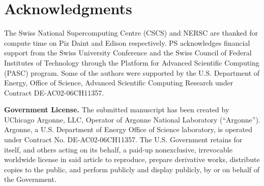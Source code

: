 \documentclass[]{siamart0216}
\begin{document}
\section{Acknowledgments}
The Swiss National Supercomputing Centre (CSCS) and NERSC are thanked for compute time on Piz Daint and Edison respectively.
PS acknowledges financial support from the Swiss University Conference and the Swiss Council of Federal
Institutes of Technology through the Platform for Advanced Scientific Computing (PASC) program.
Some of the authors were supported by the U.S. Department of Energy, Office of Science, Advanced Scientific Computing Research under Contract DE-AC02-06CH11357.

{\bf Government License.} The submitted manuscript has been created by UChicago 
Argonne, LLC,
Operator of Argonne National Laboratory (``Argonne'').
Argonne, a U.S. Department of Energy Office of Science laboratory, is
operated under Contract No. DE-AC02-06CH11357. The U.S. Government
retains for itself, and others acting on its behalf, a paid-up
nonexclusive, irrevocable worldwide license in said article to reproduce,
prepare derivative works, distribute copies to the public, and perform
publicly and display publicly, by or on behalf of the Government.
\end{document}
